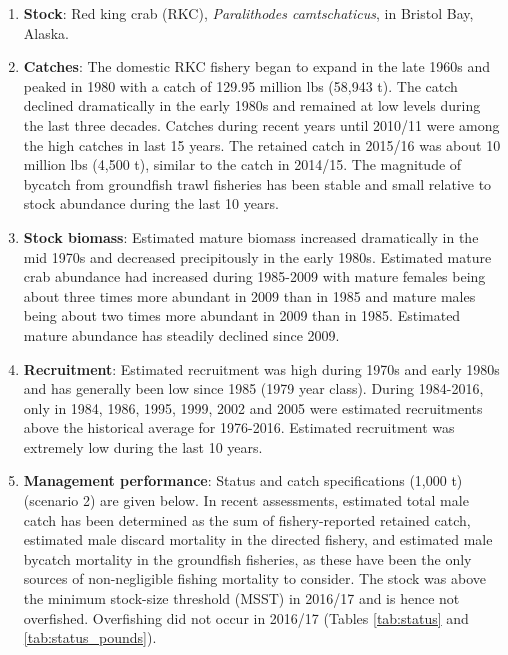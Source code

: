 \documentclass[]{article}
\begin{document}
\begin{enumerate}
\def\labelenumi{\arabic{enumi}.}
\item
  \textbf{Stock}: Red king crab (RKC), \emph{Paralithodes
  camtschaticus}, in Bristol Bay, Alaska.
\item
  \textbf{Catches}: The domestic RKC fishery began to expand in the late
  1960s and peaked in 1980 with a catch of 129.95 million lbs (58,943
  t). The catch declined dramatically in the early 1980s and remained at
  low levels during the last three decades. Catches during recent years
  until 2010/11 were among the high catches in last 15 years. The
  retained catch in 2015/16 was about 10 million lbs (4,500 t), similar
  to the catch in 2014/15. The magnitude of bycatch from groundfish
  trawl fisheries has been stable and small relative to stock abundance
  during the last 10 years.
\item
  \textbf{Stock biomass}: Estimated mature biomass increased
  dramatically in the mid 1970s and decreased precipitously in the early
  1980s. Estimated mature crab abundance had increased during 1985-2009
  with mature females being about three times more abundant in 2009 than
  in 1985 and mature males being about two times more abundant in 2009
  than in 1985. Estimated mature abundance has steadily declined since
  2009.
\item
  \textbf{Recruitment}: Estimated recruitment was high during 1970s and
  early 1980s and has generally been low since 1985 (1979 year class).
  During 1984-2016, only in 1984, 1986, 1995, 1999, 2002 and 2005 were
  estimated recruitments above the historical average for 1976-2016.
  Estimated recruitment was extremely low during the last 10 years.
\item
  \textbf{Management performance}: Status and catch specifications
  (1,000 t) (scenario 2) are given below. In recent assessments,
  estimated total male catch has been determined as the sum of
  fishery-reported retained catch, estimated male discard mortality in
  the directed fishery, and estimated male bycatch mortality in the
  groundfish fisheries, as these have been the only sources of
  non-negligible fishing mortality to consider. The stock was above the
  minimum stock-size threshold (MSST) in 2016/17 and is hence not
  overfished. Overfishing did not occur in 2016/17 (Tables
  \ref{tab:status} and \ref{tab:status_pounds}).
\end{enumerate}
\end{document}

